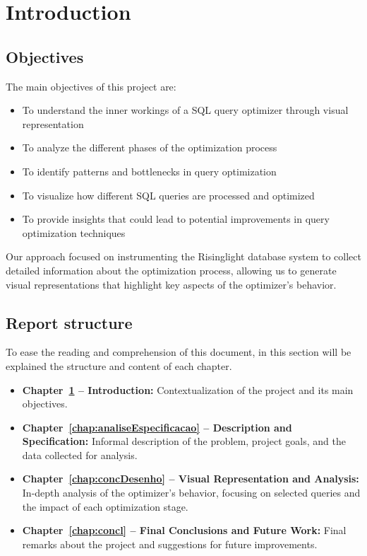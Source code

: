\documentclass[a4paper,12pt]{scrreprt}
\begin{document}
\clearpage
{}

\clearpage
\pagestyle{plain}
\hypertarget{toc}{}
\tableofcontents

\clearpage
\pagestyle{plain}
\listoffigures

\clearpage
\pagestyle{fancy}


\chapter{Introduction}\label{chap:intro}
\thispagestyle{fancy}
\section{Objectives}
The main objectives of this project are:
\begin{itemize}
    \item To understand the inner workings of a SQL query optimizer through visual representation
    \item To analyze the different phases of the optimization process
    \item To identify patterns and bottlenecks in query optimization
    \item To visualize how different SQL queries are processed and optimized
    \item To provide insights that could lead to potential improvements in query optimization techniques
\end{itemize}

Our approach focused on instrumenting the Risinglight database system to collect detailed information about the optimization process, allowing us to generate visual representations that highlight key aspects of the optimizer's behavior.

\newpage
\section{Report structure}
To ease the reading and comprehension of this document, in this section will be explained the structure and content of each chapter.

\begin{itemize}
    \item \textbf{Chapter~\ref{chap:intro} -- Introduction:} Contextualization of the project and its main objectives.
    \item \textbf{Chapter~\ref{chap:analiseEspecificacao} -- Description and Specification:} Informal description of the problem, project goals, and the data collected for analysis.
    \item \textbf{Chapter~\ref{chap:concDesenho} -- Visual Representation and Analysis:} In-depth analysis of the optimizer's behavior, focusing on selected queries and the impact of each optimization stage.
    \item \textbf{Chapter~\ref{chap:concl} -- Final Conclusions and Future Work:} Final remarks about the project and suggestions for future improvements.
\end{itemize}
\end{document}
